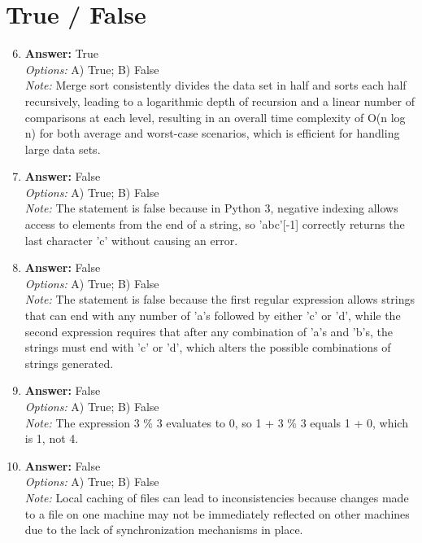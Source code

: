 \documentclass[12pt]{article}
\begin{document}
\section*{True / False}
\begin{enumerate}[label=\arabic*.]
\setcounter{enumi}{5}
\item \textbf{Answer:} True
\\ \textit{Options:} A) True; B) False
\\ \textit{Note:} Merge sort consistently divides the data set in half and sorts each half recursively, leading to a logarithmic depth of recursion and a linear number of comparisons at each level, resulting in an overall time complexity of O(n log n) for both average and worst-case scenarios, which is efficient for handling large data sets.
\item \textbf{Answer:} False
\\ \textit{Options:} A) True; B) False
\\ \textit{Note:} The statement is false because in Python 3, negative indexing allows access to elements from the end of a string, so 'abc'[-1] correctly returns the last character 'c' without causing an error.
\item \textbf{Answer:} False
\\ \textit{Options:} A) True; B) False
\\ \textit{Note:} The statement is false because the first regular expression allows strings that can end with any number of 'a's followed by either 'c' or 'd', while the second expression requires that after any combination of 'a's and 'b's, the strings must end with 'c' or 'd', which alters the possible combinations of strings generated.
\item \textbf{Answer:} False
\\ \textit{Options:} A) True; B) False
\\ \textit{Note:} The expression 3 \% 3 evaluates to 0, so 1 + 3 \% 3 equals 1 + 0, which is 1, not 4.
\item \textbf{Answer:} False
\\ \textit{Options:} A) True; B) False
\\ \textit{Note:} Local caching of files can lead to inconsistencies because changes made to a file on one machine may not be immediately reflected on other machines due to the lack of synchronization mechanisms in place.
\end{enumerate}
\end{document}
